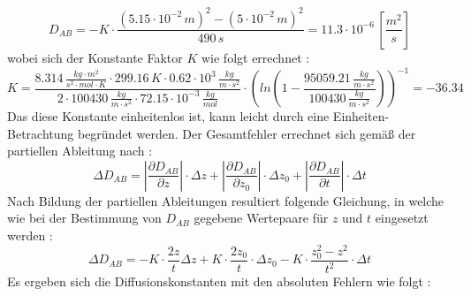 \begin{equation}
D_{AB} = -K \cdot \frac{(5.15\cdot 10^{-2} \,\si{m})^2-(5\cdot 10^{-2} \,\si{m})^2}{490\,\si{s}} = 11.3 \cdot 10^{-6} \,[\si{\frac{m^2}{s}}]
\end{equation}
wobei sich der Konstante Faktor $K$ wie folgt errechnet : 
\begin{equation}
K = \frac{8.314 \,\si{\frac{kg\cdot m^2}{s^2 \cdot  mol \cdot K}}\cdot 299.16\,\si{K} \cdot 0.62\cdot 10^3\, \si{\frac{kg}{m\cdot s^2}}}{2\cdot  100430\,\si{\frac{kg}{m\cdot s^2}}\cdot 72.15\cdot 10^{-3}\,\si{\frac{kg}{mol}}}\cdot \left(ln\left(1-\frac{95059.21\,\si{\frac{kg}{m \cdot s^2}}}{100430\,\si{\frac{kg}{m\cdot s^2}}}\right)\right) ^{-1} = -36.34 
\end{equation}
Das diese Konstante einheitenlos ist, kann leicht durch eine Einheiten-Betrachtung begründet werden. Der Gesamtfehler errechnet sich gemäß der partiellen Ableitung nach : 
\begin{equation}
\Delta D_{AB} = \left| \frac{\partial D_{AB}}{\partial z}\right|\cdot \Delta z + \left| \frac{\partial D_{AB}}{\partial z_0}\right|\cdot \Delta z_0 + \left| \frac{\partial D_{AB}}{\partial t}\right|\cdot \Delta t
\end{equation}
Nach Bildung der partiellen Ableitungen resultiert folgende Gleichung, in welche wie bei der Bestimmung von $D_{AB}$ gegebene Wertepaare für $z$ und $t$ eingesetzt werden : 
\begin{equation}
\Delta D_{AB} = -K \cdot \frac{2z}{t} \Delta z + K \cdot \frac{2z_0}{t}\cdot \Delta z_0 -K \cdot \frac{z_0^2-z^2}{t^2}\cdot \Delta t
\end{equation}
\newpage
Es ergeben sich die Diffusionskonstanten mit den absoluten Fehlern wie folgt : 
